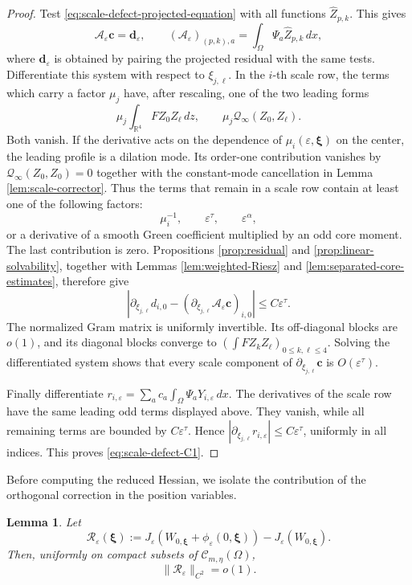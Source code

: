 \documentclass[11pt]{article}
\newtheorem{lemma}[theorem]{Lemma}
\numberwithin{equation}{section}
\begin{document}
\begin{proof}
Test \eqref{eq:scale-defect-projected-equation} with all functions
$\widehat Z_{p,k}$. This gives
\[
\mathcal A_\varepsilon\boldsymbol c
=\boldsymbol d_\varepsilon,
\qquad
(\mathcal A_\varepsilon)_{(p,k),a}
=\int_\Omega\Psi_a\widehat Z_{p,k}\,dx,
\]
where $\boldsymbol d_\varepsilon$ is obtained by pairing the
projected residual with the same tests. Differentiate this system
with respect to $\xi_{j,\ell}$. In the $i$-th scale row, the terms
which carry a factor $\mu_j$ have, after rescaling, one of the two
leading forms
\[
\mu_j\int_{\mathbb R^4}FZ_0Z_\ell\,dz,
\qquad
\mu_j\mathcal Q_\infty(Z_0,Z_\ell).
\]
Both vanish. If the derivative acts on the dependence of
$\mu_i(\varepsilon,\boldsymbol\xi)$ on the center, the leading
profile is a dilation mode. Its order-one contribution vanishes by
$\mathcal Q_\infty(Z_0,Z_0)=0$ together with the constant-mode
cancellation in Lemma \ref{lem:scale-corrector}. Thus the terms that
remain in a scale row contain at least one of the following factors:
\[
\mu_i^{-1},\qquad
\varepsilon^\tau,\qquad
\varepsilon^\alpha,
\]
or a derivative of a smooth Green coefficient multiplied by an odd
core moment. The last contribution is zero. Propositions
\ref{prop:residual} and \ref{prop:linear-solvability}, together with
Lemmas \ref{lem:weighted-Riesz} and
\ref{lem:separated-core-estimates}, therefore give
\begin{equation*}
\left|
\partial_{\xi_{j,\ell}}d_{i,0}
-(\partial_{\xi_{j,\ell}}\mathcal A_\varepsilon
\boldsymbol c)_{i,0}
\right|
\leq C\varepsilon^\tau.
\end{equation*}
The normalized Gram matrix is uniformly invertible. Its off-diagonal
blocks are $o(1)$, and its diagonal blocks converge to
$(\int FZ_kZ_\ell)_{0\leq k,\ell\leq4}$. Solving the differentiated system
shows that every scale component of
$\partial_{\xi_{j,\ell}}\boldsymbol c$ is
$O(\varepsilon^\tau)$.

Finally differentiate
$r_{i,\varepsilon}=
\sum_a c_a\int_\Omega\Psi_aY_{i,\varepsilon}\,dx$. The derivatives
of the scale row have the same leading odd terms displayed above.
They vanish, while all remaining terms are bounded by
$C\varepsilon^\tau$. Hence
$|\partial_{\xi_{j,\ell}}r_{i,\varepsilon}|
\leq C\varepsilon^\tau$, uniformly in all indices. This proves
\eqref{eq:scale-defect-C1}.
\end{proof}

Before computing the reduced Hessian, we isolate the contribution of
the orthogonal correction in the position variables.

\begin{lemma}\label{lem:position-correction-C2}
Let
\[
\mathcal R_\varepsilon(\boldsymbol\xi)
:=J_\varepsilon(W_{0,\boldsymbol\xi}
+\phi_\varepsilon(0,\boldsymbol\xi))
-J_\varepsilon(W_{0,\boldsymbol\xi}).
\]
Then, uniformly on compact subsets of
$\mathcal C_{m,\eta}(\Omega)$,
\begin{equation}\label{eq:position-correction-C2}
\|\mathcal R_\varepsilon\|_{C^2}=o(1).
\end{equation}
\end{lemma}
\end{document}
